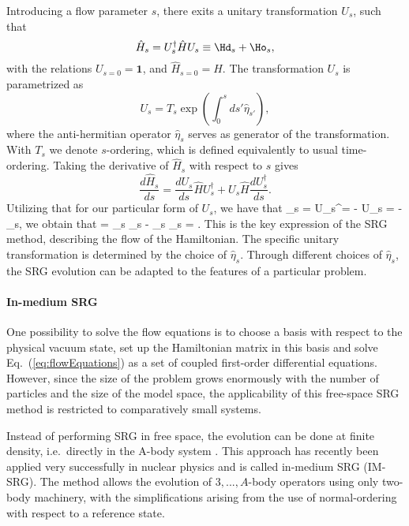  Introducing a flow parameter $s$, there exits a unitary
 transformation $U_s$, such that
\begin{equation}
 \hat{H}_s = U_s^\dagger \hat{H} U_s \equiv \Hd_s + \Ho_s,
\end{equation}
with the relations $U_{s=0} = \mathbf{1}$, and $\hat{H}_{s= 0} =
\hat{H}$.  The transformation $U_s$ is parametrized as
\[
U_s = T_s \exp \left(\int_0^s \! ds'\hat{\eta}_{s'} \right),
\]
where the anti-hermitian operator $\hat{\eta}_s$ serves as generator
of the transformation. With $T_s$ we denote $s$-ordering, which is
defined equivalently to usual time-ordering.  Taking the derivative of
$\hat{H}_s$ with respect to $s$ gives
\begin{equation}
 \frac{d \hat{H}_s}{ds} = \frac{d U_s}{ds}\hat{H} U_s^\dagger + U_s
 \hat{H} \frac{d U_s^\dagger}{ds}.
\label{eq:flow_long}
\end{equation}
Utilizing that for our particular form of $U_s$, we have that \be
\hat{\eta}_s =  U_s^\dagger = - U_s  = -\hat{\eta}_s,
\label{eq:eta}
\ee we obtain that \be {} = \hat{\eta}_s _s
- _s \hat{\eta}_s = .
\label{eq:flowEquations}
\ee This is the key expression of the SRG method, describing the flow
of the Hamiltonian.  The specific unitary transformation is determined
by the choice of $\hat{\eta}_s$.  Through different choices of
$\hat{\eta}_s$, the SRG evolution can be adapted to the features of a
particular problem.\\

\paragraph*{In-medium SRG}

One possibility to solve the flow equations is to choose a basis with
respect to the physical vacuum state, set up the Hamiltonian matrix in
this basis and solve Eq.~(\ref{eq:flowEquations}) as a set of coupled
first-order differential equations. However, since the size of the
problem grows enormously with the number of particles and the size of
the model space, the applicability of this free-space SRG method is
restricted to comparatively small systems.

Instead of performing SRG in free space, the evolution can be done at
finite density, i.e.~directly in the A-body system
\cite{kehrein2006flow}. This approach has recently been applied very
successfully in nuclear physics \cite{IMSRG,PhysRevLett.106.222502}
and is called in-medium SRG (IM-SRG). The method allows the evolution
of $3,...,A$-body operators using only two-body machinery, with the
simplifications arising from the use of normal-ordering with respect
to a reference state.

